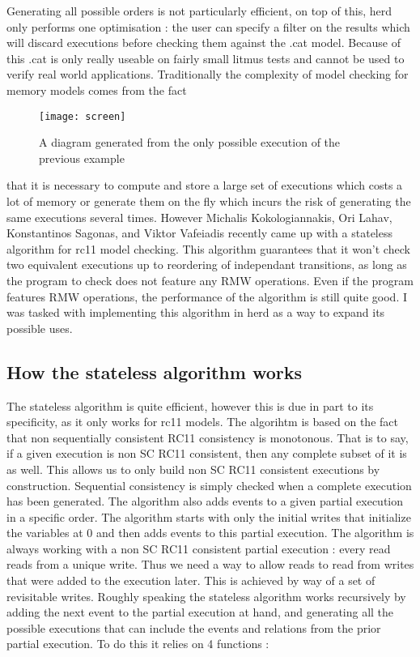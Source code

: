 \documentclass[a4,11pt,dvipsnames]{article}
\begin{document}
Generating all possible orders is not particularly efficient, on top of this, herd only performs one optimisation : the user can specify a filter on the results which will discard executions before checking them against the .cat model. Because of this .cat is only really useable on fairly small litmus tests and cannot be used to verify real world applications. Traditionally the complexity of model checking for memory models comes from the fact \begin{wrapfigure}[17]{r}{4.5cm}
\texttt{[image: screen]}
\caption{{\footnotesize{A diagram generated from the only possible execution of the previous example}}}
\end{wrapfigure} that it is necessary to compute and store a large set of executions which costs a lot of memory or generate them on the fly which incurs the risk of generating the same executions several times. However Michalis Kokologiannakis, Ori Lahav, Konstantinos Sagonas, and Viktor Vafeiadis recently came up with a stateless algorithm\cite{stateless} for rc11 model checking. This algorithm guarantees that it won't check two equivalent executions up to reordering of independant transitions, as long as the program to check does not feature any RMW operations. Even if the program features RMW operations, the performance of the algorithm is still quite good. I was tasked with implementing this algorithm in herd as a way to expand its possible uses.

\vspace{2cm}

\subsection{How the stateless algorithm works}

The stateless algorithm is quite efficient, however this is due in part to its specificity, as it only works for rc11 models. The algorihtm is based on the fact that non sequentially consistent RC11 consistency is monotonous. That is to say, if a given execution is non SC RC11 consistent, then any complete subset of it is as well. This allows us to only build non SC RC11 consistent executions by construction. Sequential consistency is simply checked when a complete execution has been generated. The algorithm also adds events to a given partial execution in a specific order. The algorithm starts with only the initial writes that initialize the variables at 0 and then adds events to this partial execution. The algorithm is always working with a non SC RC11 consistent partial execution : every read reads from a unique write. Thus we need a way to allow reads to read from writes that were added to the execution later. This is achieved by way of a set of revisitable writes.
Roughly speaking the stateless algorithm works recursively by adding the next event to the partial execution at hand, and generating all the possible executions that can include the events and relations from the prior partial execution. To do this it relies on 4 functions :
\end{document}
